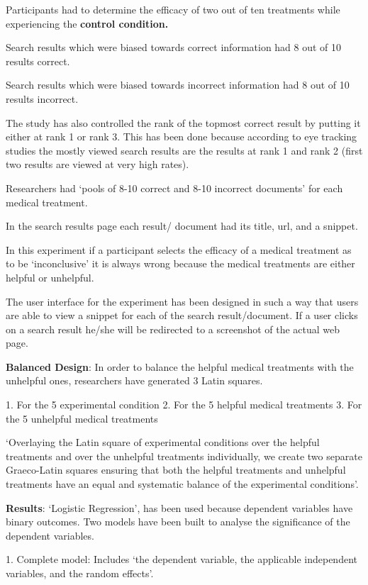 \documentclass[]{article}
\begin{document}
Participants had to determine the efficacy of two out of ten treatments while experiencing the \textbf{control condition.  }

Search results which were biased towards correct information had 8 out of 10 results correct.

Search results which were biased towards incorrect information had 8 out of 10 results incorrect.

The study has also controlled the rank of the topmost correct result by putting it either at rank 1 or rank 3. This has been done because according to eye tracking studies the mostly viewed search results are the results at rank 1 and rank 2 (first two results are viewed at very high rates).

Researchers had ‘pools of 8-10 correct and 8-10 incorrect documents’ for each medical treatment. 

In the search results page each result/ document had its title, url, and a snippet. 

In this experiment if a participant selects the efficacy of a medical treatment as to be ‘inconclusive’ it is always wrong because the medical treatments are either helpful or unhelpful. 

The user interface for the experiment has been designed in such a way that users are able to view a snippet for each of the search result/document. If a user clicks on a search result he/she will be redirected to a screenshot of the actual web page. 

\textbf{Balanced Design}: In order to balance the helpful medical treatments with the unhelpful ones, researchers have generated 3 Latin squares. 

1.	For the 5 experimental condition
2.	For the 5 helpful medical treatments
3.	For the 5 unhelpful medical treatments

‘Overlaying the Latin square of experimental conditions over the helpful treatments and over the unhelpful treatments individually, we create two separate Graeco-Latin squares ensuring that both the helpful treatments and unhelpful treatments have an equal and systematic balance of the experimental conditions’.

\textbf{Results}: ‘Logistic Regression’, has been used because dependent variables have binary outcomes. Two models have been built to analyse the significance of the dependent variables.  

1.	Complete model: Includes ‘the dependent variable, the applicable independent variables, and the random effects’.
 
\end{document}
